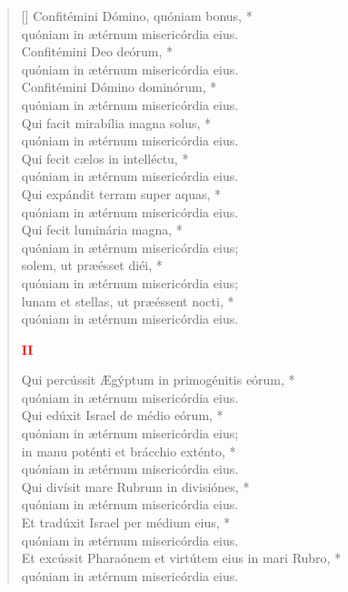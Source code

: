 \begin{verse}[\versewidth]
Confitémini Dómino, quóniam bonus, *\\
quóniam in ætérnum misericórdia eius.\\
\vin Confitémini Deo deórum, *\\
\vin quóniam in ætérnum misericórdia eius.\\
Confitémini Dómino dominórum, *\\
quóniam in ætérnum misericórdia eius.\\
\vin Qui facit mirabília magna solus, *\\
\vin quóniam in ætérnum misericórdia eius.\\
Qui fecit cælos in intelléctu, *\\
quóniam in ætérnum misericórdia eius.\\
\vin Qui expándit terram super aquas, *\\
\vin quóniam in ætérnum misericórdia eius.\\
Qui fecit luminária magna, *\\
quóniam in ætérnum misericórdia eius;\\
\vin solem, ut præésset diéi, *\\
\vin quóniam in ætérnum misericórdia eius;\\
lunam et stellas, ut præéssent nocti, *\\
quóniam in ætérnum misericórdia eius.\\
\begin{center}
\textcolor{red}{\bf II}
\end{center}
Qui percússit Ægýptum in primogénitis eórum, *\\
quóniam in ætérnum misericórdia eius.\\
\vin Qui edúxit Israel de médio eórum, *\\
\vin quóniam in ætérnum misericórdia eius;\\
in manu poténti et brácchio exténto, *\\
quóniam in ætérnum misericórdia eius.\\
\vin Qui divísit mare Rubrum in divisiónes, *\\
\vin quóniam in ætérnum misericórdia eius.\\
Et tradúxit Israel per médium eius, *\\
quóniam in ætérnum misericórdia eius.\\
\vin Et excússit Pharaónem et virtútem eius in mari Rubro, *\\
\vin quóniam in ætérnum misericórdia eius.\\

\end{verse}
